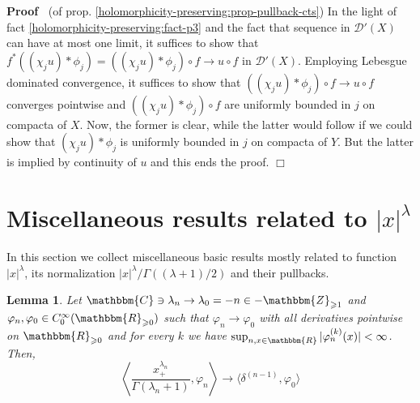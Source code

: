\documentclass{article}
\newenvironment{proof}{\noindent\textbf{Proof\ }}{\hspace*{\fill}$\Box$\medskip}
\numberwithin{definition}{section}
\newtheorem{lemma}{Lemma}
\numberwithin{lemma}{section}
\numberwithin{proposition}{section}
{\theorembodyfont{\rmfamily}\newtheorem{remark}{Remark}
\numberwithin{remark}{section}
}
\begin{document}
\begin{proof}
  (of prop. \ref{holomorphicity-preserving:prop-pullback-cts}) In the light of
  fact \ref{holomorphicity-preserving:fact-p3} and the fact that sequence in
  $\mathcal{D}' ( X)$ can have at most one limit, it suffices to show that
  $f^{\ast} ( ( \chi_j u) \ast \phi_j) = ( ( \chi_j u) \ast \phi_j) \circ f
  \rightarrow u \circ f$ in $\mathcal{D}' ( X)$. Employing Lebesgue dominated
  convergence, it suffices to show that $( ( \chi_j u) \ast \phi_j) \circ f
  \rightarrow u \circ f$ converges pointwise and $( ( \chi_j u) \ast \phi_j)
  \circ f$ are uniformly bounded in $j$ on compacta of $X$. Now, the former is
  clear, while the latter would follow if we could show that $( \chi_j u) \ast
  \phi_j$ is uniformly bounded in $j$ on compacta of $Y$. But the latter is
  implied by continuity of $u$ and this ends the proof.
\end{proof}

\section{Miscellaneous results related to $| x |^{\lambda}$}

In this section we collect miscellaneous basic results mostly related to
function $| x |^{\lambda}$, its normalization $| x |^{\lambda} / \Gamma ( (
\lambda + 1) / 2)$ and their pullbacks.

\begin{lemma}
  \label{supp-n-waves:lem-weakened-conv}Let $\mathbbm{C} \ni \lambda_n
  \rightarrow \lambda_0 = - n \in -\mathbbm{Z}_{\geqslant 1}$ and $\varphi_n,
  \varphi_0 \in C^{\infty}_0 ( \mathbbm{R}_{\geqslant 0})$ such that
  $\varphi_n \rightarrow \varphi_0$ with all derivatives pointwise on
  $\mathbbm{R}_{\geqslant 0}$ and for every $k$ we have $\sup_{n, x \in
  \mathbbm{R}} | \varphi_n^{( k)} ( x) | < \infty$. Then,
  \[ \left\langle \frac{x_+^{\lambda_n}}{\Gamma ( \lambda_n + 1)}, \varphi_n
     \right\rangle \rightarrow \langle \delta^{( n - 1)}, \varphi_0 \rangle \]
\end{lemma}
\end{document}
